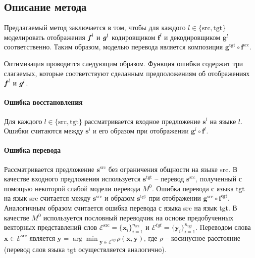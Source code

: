 \documentclass[12pt,twoside]{article}
\begin{document}
\subsection{Описание метода}
   Предлагаемый метод заключается в том, чтобы для каждого $l \in \{\text{src}, \text{tgt}\}$  моделировать отображения $\textbf{\textit{f}}^{l}$ и $\textbf{\textit{g}}^{l}$ кодировщиком $\textbf{f}^{l}$ и декодировщиком $\textbf{g}^{l}$ соответственно. Таким образом, моделью перевода является композиция $\textbf{g}^{\text{tgt}} \circ \textbf{f}^{\text{src}}$. 
   
   Оптимизация проводится следующим образом. Функция ошибки содержит три слагаемых, которые соответствуют сделанным предположениям об отображениях $\textbf{\textit{f}}^{l}$ и $\textbf{\textit{g}}^{l}$.
   \paragraph{Ошибка восстановления} Для каждого $l \in \{\text{src}, \text{tgt}\}$ рассматривается входное предложение $\mathbf{s}^{l}$ на языке $l$. Ошибки считаются между $\mathbf{s}^{l}$ и его образом при отображении $\textbf{g}^{l} \circ \textbf{f}^{l}$.
   
   \paragraph{Ошибка перевода} Рассматривается предложение $\mathbf{s}^{\text{src}}$ без ограничения общности на языке src. В качестве входного предложения используется $\mathbf{s}^{\text{tgt}}$ -- перевод $\mathbf{s}^{\text{src}}$, полученный с помощью некоторой слабой модели перевода $M^0$. Ошибка перевода с языка tgt на язык src считается между $\mathbf{s}^{\text{src}}$ и образом $\mathbf{s}^{\text{tgt}}$ при отображении $\textbf{g}^{\text{src}} \circ \textbf{f}^{\text{tgt}}$. Аналогичным образом считается ошибка перевода с языка src на язык tgt. В качестве $M^0$ используется пословный переводчик на основе предобученных векторных представлений слов $\mathcal{E}^{\text{src}} = \{\textbf{x}_i\}_{i=1}^{n_{\text{src}}}$ и $\mathcal{E}^{tgt} = \{\textbf{y}_i\}_{i=1}^{n_{\text{tgt}}}$. Переводом слова $\textbf{x} \in \mathcal{E}^{\text{src}}$ является $\textbf{y} = {\arg\min}_{\textbf{y} \in  \mathcal{E}^{\text{tgt}}} \rho(\textbf{x}, \textbf{y})$, где $\rho$ -- косинусное расстояние (перевод слов языка $\text{tgt}$ осуществляется аналогично).
   
\end{document}
